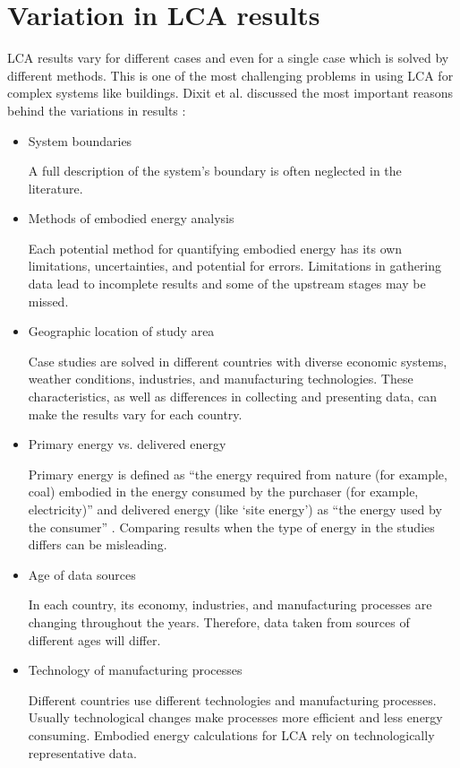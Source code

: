\documentclass[10pt]{article}
\begin{document}
\section{Variation in LCA results}
 
LCA results vary for different cases and even for a single case which is solved by different methods. This is one of the most challenging problems in using LCA for complex systems like buildings. Dixit et al.  discussed the most important reasons behind the variations in results \cite{dixit2010identification}:

\begin{itemize}
\item  System boundaries

A full description of the system's boundary is often neglected in the literature. %
  
\item  Methods of embodied energy analysis

Each potential method for quantifying embodied energy has its own limitations, uncertainties, and potential for errors.  Limitations in gathering data lead to incomplete results and some of the upstream stages may be missed. 

\item  Geographic location of study area

Case studies are solved in different countries with diverse economic systems, weather conditions, industries, and manufacturing technologies. These  characteristics, as well as differences in collecting and presenting data, can  make the results vary for each country.

\item  Primary energy vs. delivered energy

Primary energy is defined as ``the energy required from nature (for example, coal) embodied in the energy consumed by the purchaser (for example, electricity)'' \cite{dixit2010identification} and delivered energy (like `site energy') as ``the energy used by the consumer'' \cite{dixit2010identification}. Comparing results when the type of energy in the studies differs can be misleading. 

\item Age of data sources

In each country, its economy, industries, and manufacturing processes are changing throughout the years. Therefore, data taken from sources of different ages will differ. 

 
\item Technology of manufacturing processes

Different countries use different technologies and manufacturing processes. Usually technological changes make processes more efficient and less energy consuming. Embodied energy calculations for LCA rely on technologically representative data. 
\end{itemize}
\end{document}

